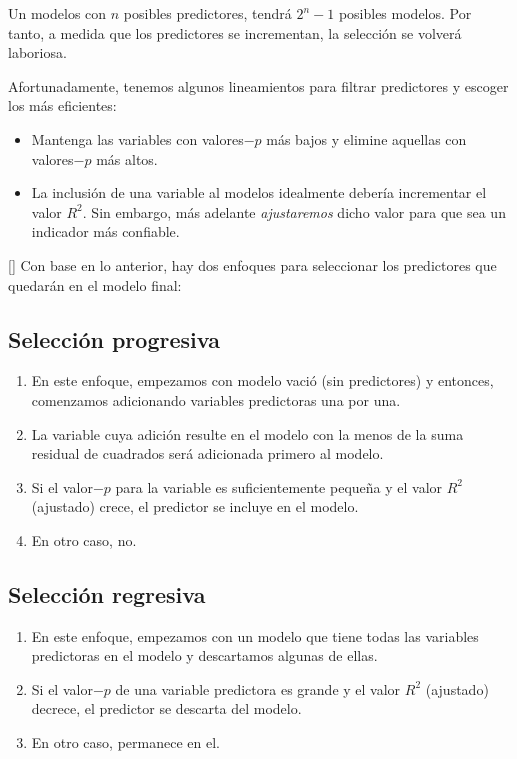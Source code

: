 \begin{observacion}
	Un modelos con $n$ posibles predictores, tendrá $2^{n}-1$ posibles modelos. Por tanto, a medida que los predictores se incrementan, la selección se volverá laboriosa.
\end{observacion}



Afortunadamente, tenemos algunos lineamientos para filtrar predictores y escoger los más eficientes:
\begin{itemize}
	\item Mantenga las variables con valores$-p$ más bajos y elimine aquellas con valores$-p$ más altos. 
	\item La inclusión de una variable al modelos idealmente debería incrementar el valor $R^{2}.$  Sin embargo, más adelante \emph{ajustaremos} dicho valor para que sea un indicador más confiable.
\end{itemize}


[]{}
Con base en lo anterior, hay dos enfoques para seleccionar los predictores que quedarán en el modelo final:


\subsection{Selección progresiva}
\begin{enumerate}
	\item En este enfoque, empezamos con modelo vació (sin predictores) y entonces, comenzamos adicionando variables predictoras una por una. 
	\item La variable cuya adición resulte en el modelo con la menos de la suma residual de cuadrados será adicionada primero al modelo. \item Si el valor$-p$ para la variable es suficientemente pequeña y el valor $R^{2}$ (ajustado) crece, el predictor se incluye en el modelo. 
	\item En otro caso, no.
\end{enumerate}


\subsection{Selección regresiva}
\begin{enumerate}
	\item En este enfoque, empezamos con un modelo que tiene todas las variables predictoras en el modelo y descartamos algunas de ellas.
	
	
	\item Si el valor$-p$ de una variable predictora es grande y el valor $R^{2}$ (ajustado) decrece, el predictor se descarta del modelo.
	
	
	
	\item En otro caso, permanece en el.
\end{enumerate}



